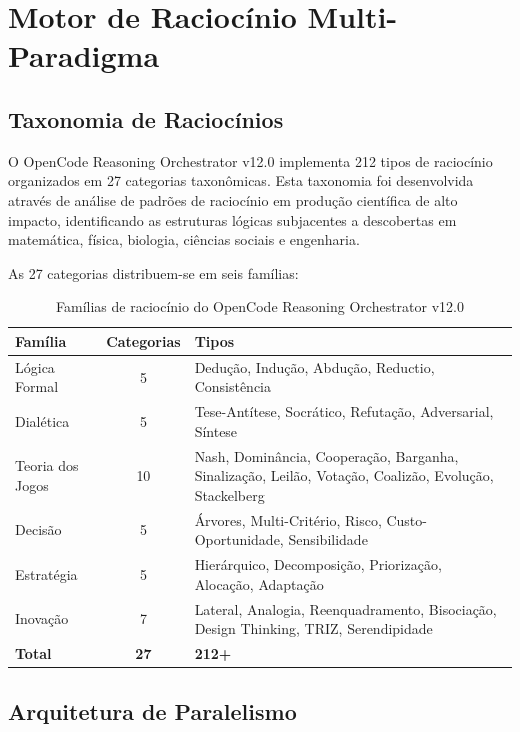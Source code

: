 \documentclass[12pt,a4paper,sumario=tradicional]{abntex2}
\begin{document}
\chapter{Motor de Raciocínio Multi-Paradigma}

\section{Taxonomia de Raciocínios}

O OpenCode Reasoning Orchestrator v12.0 implementa 212 tipos de raciocínio organizados em 27 categorias taxonômicas. Esta taxonomia foi desenvolvida através de análise de padrões de raciocínio em produção científica de alto impacto, identificando as estruturas lógicas subjacentes a descobertas em matemática, física, biologia, ciências sociais e engenharia.

As 27 categorias distribuem-se em seis famílias:

\begin{table}[H]
\centering
\caption{Famílias de raciocínio do OpenCode Reasoning Orchestrator v12.0}
\label{tab:reasoning}
\begin{tabular}{@{}lcp{6cm}@{}}
\toprule
\textbf{Família} & \textbf{Categorias} & \textbf{Tipos} \\
\midrule
Lógica Formal     & 5  & Dedução, Indução, Abdução, Reductio, Consistência \\
Dialética         & 5  & Tese-Antítese, Socrático, Refutação, Adversarial, Síntese \\
Teoria dos Jogos  & 10 & Nash, Dominância, Cooperação, Barganha, Sinalização, Leilão, Votação, Coalizão, Evolução, Stackelberg \\
Decisão           & 5  & Árvores, Multi-Critério, Risco, Custo-Oportunidade, Sensibilidade \\
Estratégia        & 5  & Hierárquico, Decomposição, Priorização, Alocação, Adaptação \\
Inovação          & 7  & Lateral, Analogia, Reenquadramento, Bisociação, Design Thinking, TRIZ, Serendipidade \\
\midrule
\textbf{Total}    & \textbf{27} & \textbf{212+} \\
\bottomrule
\end{tabular}
\end{table}

\section{Arquitetura de Paralelismo}
\end{document}
